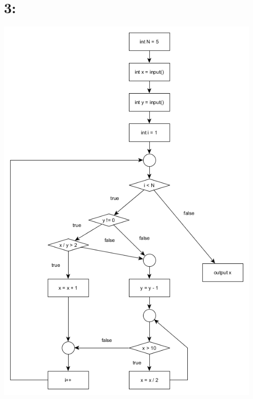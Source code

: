 \documentclass{article}
\begin{document}
\section*{3:}
\includegraphics[scale = 0.8]{graph3.png}
\end{document}
